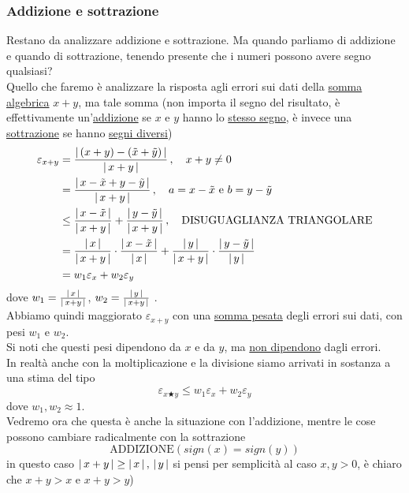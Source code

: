 \documentclass[12pt]{article}
\DeclarePairedDelimiter{\abs}{\lvert}{\rvert}
\begin{document}
\subsubsection{Addizione e sottrazione}
Restano da analizzare addizione e sottrazione. Ma quando parliamo di addizione e quando di sottrazione, tenendo presente che i numeri possono avere segno qualsiasi?\\
Quello che faremo è analizzare la risposta agli errori sui dati della \uline{somma algebrica} $x + y$, ma tale somma (non importa il segno del risultato, è effettivamente un'\uline{addizione} se $x$ e $y$ hanno lo \uline{stesso segno}, è invece una \uline{sottrazione} se hanno \uline{segni diversi})
\[\begin{split}
    \varepsilon_{x+y} & = \frac{\abs*{\,(x + y) - (\Tilde{x} + \Tilde{y})\,}}{\abs*{\,x + y\,}} \,, \quad x + y \ne 0 \\
    & = \frac{\abs*{\,x - \Tilde{x} + y - \Tilde{y}\,}}{\abs*{\,x + y\,}} \,, \quad a = x - \Tilde{x} \text{ e } b = y - \Tilde{y} \\
    & \le \frac{\abs*{\,x - \Tilde{x}\,}}{\abs*{\,x + y\,}} + \frac{\abs*{\,y - \Tilde{y}\,}}{\abs*{\,x + y\,}} \,, \quad \text{DISUGUAGLIANZA TRIANGOLARE} \\
    & = \frac{\abs*{\,x\,}}{\abs*{\,x + y\,}} \cdot \frac{\abs*{\,x - \Tilde{x}\,}}{\abs*{\,x\,}} + \frac{\abs*{\,y\,}}{\abs*{\,x + y\,}} \cdot \frac{\abs*{\,y - \Tilde{y}\,}}{\abs*{\,y\,}} \\
    & = w_1 \varepsilon_x + w_2 \varepsilon_y
\end{split}\]
dove $w_1 = \frac{\abs*{\,x\,}}{\abs*{\,x + y\,}}$, $w_2 = \frac{\abs*{\,y\,}}{\abs*{\,x + y\,}}$ .\\
Abbiamo quindi maggiorato $\varepsilon_{x+y}$ con una \uline{somma pesata} degli errori sui dati, con pesi $w_1$ e $w_2$.\\
Si noti che questi pesi dipendono da $x$ e da $y$, ma \uline{non dipendono} dagli errori.\\
In realtà anche con la moltiplicazione e la divisione siamo arrivati in sostanza a una stima del tipo
\[\varepsilon_{x \bigstar y} \le w_1 \varepsilon_x + w_2 \varepsilon_y\]
dove $w_1, w_2 \approx 1$. \\
Vedremo ora che questa è anche la situazione con l’addizione, mentre le cose possono cambiare radicalmente con la sottrazione \\
\[\text{ADDIZIONE} (sign(x) = sign(y))\]
in questo caso $\abs{\,x + y\,} \ge \abs{\,x\,}\,,\,\abs{\,y\,}$ si pensi per semplicità al caso $x,y > 0$, è chiaro che $x + y > x$ e $x + y > y$) \\
\end{document}
